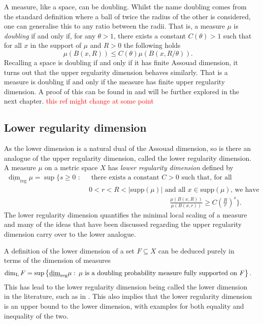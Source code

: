 A measure, like a space, can be doubling. Whilst the name doubling comes from the standard definition where a ball of twice the radius of the other is considered, one can generalise this to any ratio between the radii. That is, a measure $\mu$ is \textit{doubling} if and only if, for any $\theta > 1$, there exists a constant $C(\theta) > 1$ such that for all $x$ in the support of $\mu$ and $R > 0$ the following holds
\[
\mu(B(x,R)) \le C(\theta) \mu(B(x,R/\theta)).
\]
Recalling a space is doubling if and only if it has finite Assouad dimension, it turns out that the upper regularity dimension behaves similarly. That is a measure is doubling if and only if the measure has finite upper regularity dimension. A proof of this can be found in \cite[Lemma 3.2]{kaenmakinew} and will be further explored in the next chapter. \textcolor{red}{this ref might change at some point}


\subsection{Lower regularity dimension}
\label{sec:intro-lower-reg}


As the lower dimension is a natural dual of the Assouad dimension, so is there an analogue of the upper regularity dimension, called the lower regularity dimension. A measure $\mu$ on a metric space $X$ has \textit{lower regularity dimension} defined by 
\begin{align*} 
\underline{\dim}_{\text{reg}} \mu = \sup \Bigg\{ s \geq 0 \, \,  : \,  &\,\text{ there exists a  constant }C  > 0\text{  such that, for all }  \\ & \, 0< r< R < \lvert \text{supp}(\mu)    \rvert \text{  and all $x \in \text{supp} (\mu)$, we have }  \\  & \hspace{5cm} \frac{\mu(B(x,R))}{\mu(B(x,r))} \geq C\left(\frac{R}{r}\right)^{s} \Bigg\}.
\end{align*}
The lower regularity dimension quantifies the minimal local scaling of a measure and many of the ideas that have been discussed regarding the upper regularity dimension carry over to the lower analogue. 

A definition of the lower dimension of a set $F\subseteq X$ can be deduced purely in terms of the dimension of measures
\begin{equation}
    \dim_{\text{L}} F = \sup \left\{ \underline{\dim}_{\textup{reg}} \mu \,  \colon \, \mu \text{ is a doubling probability measure fully supported on } F\right\}.
\end{equation}
This has lead to the lower regularity dimension being called the lower dimension in the literature, such as in \cite{}. This also implies that the lower regularity dimension is an upper bound to the lower dimension, with examples for both equality and inequality of the two.

